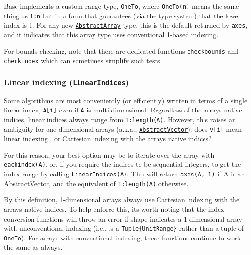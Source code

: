 Base implements a custom range type, \texttt{OneTo}, where \texttt{OneTo(n)} means the same thing as \texttt{1:n} but in a form that guarantees (via the type system) that the lower index is 1. For any new \hyperlink{6514416309183787338}{\texttt{AbstractArray}} type, this is the default returned by \texttt{axes}, and it indicates that this array type uses {\textquotedbl}conventional{\textquotedbl} 1-based indexing.



For bounds checking, note that there are dedicated functions \texttt{checkbounds} and \texttt{checkindex} which can sometimes simplify such tests.



\hypertarget{15690038127583202025}{}


\subsubsection{Linear indexing (\texttt{LinearIndices})}



Some algorithms are most conveniently (or efficiently) written in terms of a single linear index, \texttt{A[i]} even if \texttt{A} is multi-dimensional. Regardless of the array{\textquotesingle}s native indices, linear indices always range from \texttt{1:length(A)}. However, this raises an ambiguity for one-dimensional arrays (a.k.a., \hyperlink{12517057979818647811}{\texttt{AbstractVector}}): does \texttt{v[i]} mean linear indexing , or Cartesian indexing with the array{\textquotesingle}s native indices?



For this reason, your best option may be to iterate over the array with \texttt{eachindex(A)}, or, if you require the indices to be sequential integers, to get the index range by calling \texttt{LinearIndices(A)}. This will return \texttt{axes(A, 1)} if A is an AbstractVector, and the equivalent of \texttt{1:length(A)} otherwise.



By this definition, 1-dimensional arrays always use Cartesian indexing with the array{\textquotesingle}s native indices. To help enforce this, it{\textquotesingle}s worth noting that the index conversion functions will throw an error if shape indicates a 1-dimensional array with unconventional indexing (i.e., is a \texttt{Tuple\{UnitRange\}} rather than a tuple of \texttt{OneTo}). For arrays with conventional indexing, these functions continue to work the same as always.




